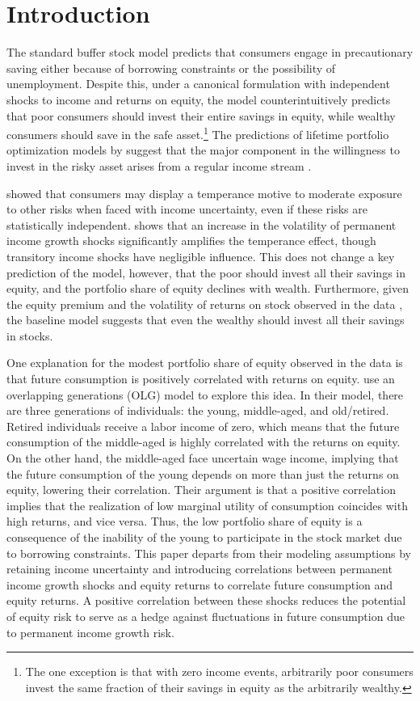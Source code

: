\section{Introduction}

The standard buffer stock model \citep{Deaton1991, Carroll1992} predicts that consumers engage in precautionary saving either because of borrowing constraints or the possibility of unemployment. Despite this, under a canonical formulation with independent shocks to income and returns on equity, the model counterintuitively predicts that poor consumers should invest their entire savings in equity, while wealthy consumers should save in the safe asset.\footnote{The one exception is that with zero income events, arbitrarily poor consumers invest the same fraction of their savings in equity as the arbitrarily wealthy.} The predictions of lifetime portfolio optimization models by \citet{Merton1969, Samuelson1969} suggest that the major component in the willingness to invest in the risky asset arises from a regular income stream \citep{Heaton1997}. 

\citet{Kimball1991} showed that consumers may display a temperance motive to moderate exposure to other risks when faced with income uncertainty, even if these risks are statistically independent. \citet{Koo1999} shows that an increase in the volatility of permanent income growth shocks significantly amplifies the temperance effect, though transitory income shocks have negligible influence. This does not change a key prediction of the model, however, that the poor should invest all their savings in equity, and the portfolio share of equity declines with wealth. Furthermore, given the equity premium and the volatility of returns on stock observed in the data \citep{Mehra1985}, the baseline model suggests that even the wealthy should invest all their savings in stocks.

One explanation for the modest portfolio share of equity observed in the data is that future consumption is positively correlated with returns on equity. \citet{Constantinides2002} use an overlapping generations (OLG) model to explore this idea. In their model, there are three generations of individuals: the young, middle-aged, and old/retired. Retired individuals receive a labor income of zero, which means that the future consumption of the middle-aged is highly correlated with the returns on equity. On the other hand, the middle-aged face uncertain wage income, implying that the future consumption of the young depends on more than just the returns on equity, lowering their correlation. Their argument is that a positive correlation implies that the realization of low marginal utility of consumption coincides with high returns, and vice versa. Thus, the low portfolio share of equity is a consequence of the inability of the young to participate in the stock market due to borrowing constraints. This paper departs from their modeling assumptions by retaining income uncertainty and introducing correlations between permanent income growth shocks and equity returns to correlate future consumption and equity returns. A positive correlation between these shocks reduces the potential of equity risk to serve as a hedge against fluctuations in future consumption due to permanent income growth risk.

